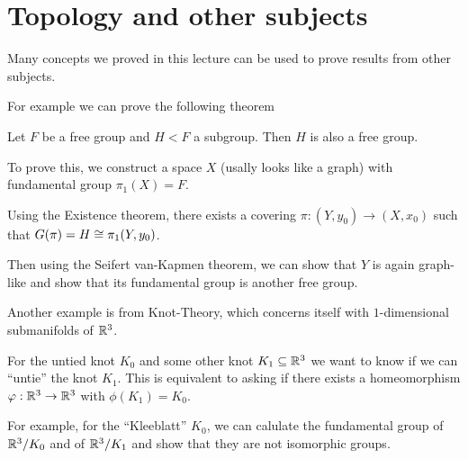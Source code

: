 \section{Topology and other subjects}
Many concepts we proved in this lecture can be used to prove results from other subjects.

For example we can prove the following theorem
\begin{thm}[]
Let $F$ be a free group and $H < F$ a subgroup. Then $H$ is also a free group.
\end{thm}
To prove this, we construct a space $X$ (usally looks like a graph) with fundamental group $\pi_1(X) = F$.

Using the Existence theorem, there exists a covering $\pi:(Y,y_0) \to  (X,x_0)$ such that $G(\pi) = H \cong \pi_1(Y,y_0)$.

Then using the Seifert van-Kapmen theorem, we can show that $Y$ is again graph-like and show that its fundamental group is another free group.

Another example is from Knot-Theory, which concerns itself with $1$-dimensional submanifolds of $\mathbb{R}^{3}$.

For the untied knot $K_0$ and some other knot $K_1 \subseteq \mathbb{R}^{3}$ we want to know if we can ``untie'' the knot $K_1$.
This is equivalent to asking if there exists a homeomorphism $\varphi:\mathbb{R}^{3} \to \mathbb{R}^{3}$ with $\phi(K_1) = K_0$.

For example, for the ``Kleeblatt'' $K_0$, we can calulate the fundamental group of $\mathbb{R}^{3}/K_0$ and of $\mathbb{R}^{3}/K_1$ and show that they are not isomorphic groups.


